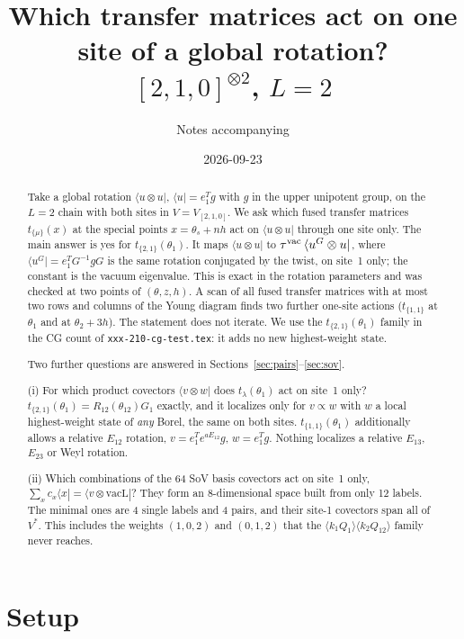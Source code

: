 \documentclass[11pt]{article}
\title{Which transfer matrices act on one site of a global rotation?\\
$[2,1,0]^{\otimes2}$, $L=2$}
\author{Notes accompanying \nb{L2-localizing-transfer.wb}}
\date{2026-09-23}
\newcommand{\nb}[1]{\texttt{#1}}
\theoremstyle{definition}
\theoremstyle{remark}
\begin{document}
\maketitle

\begin{abstract}
Take a global rotation $\langle u\otimes u|$, $\langle u|=e_1^Tg$ with $g$ in the upper unipotent group, on the $L=2$ chain with both sites in $V=V_{[2,1,0]}$. We ask which fused transfer matrices $t_{\{\mu\}}(x)$ at the special points $x=\theta_s+nh$ act on $\langle u\otimes u|$ through one site only. The main answer is yes for $t_{\{2,1\}}(\theta_1)$. It maps $\langle u\otimes u|$ to $\tau^{\rm vac}\,\langle u^G\otimes u|$, where $\langle u^G|=e_1^TG^{-1}gG$ is the same rotation conjugated by the twist, on site~1 only; the constant is the vacuum eigenvalue. This is exact in the rotation parameters and was checked at two points of $(\theta,z,h)$. A scan of all fused transfer matrices with at most two rows and columns of the Young diagram finds two further one-site actions ($t_{\{1,1\}}$ at $\theta_1$ and at $\theta_2+3h$). The statement does not iterate. We use the $t_{\{2,1\}}(\theta_1)$ family in the CG count of \nb{xxx-210-cg-test.tex}: it adds no new highest-weight state.

Two further questions are answered in Sections~\ref{sec:pairs}--\ref{sec:sov}.

(i) For which product covectors $\langle v\otimes w|$ does $t_\lambda(\theta_1)$ act on site~1 only? $t_{\{2,1\}}(\theta_1)=R_{12}(\theta_{12})G_1$ exactly, and it localizes only for $v\propto w$ with $w$ a local highest-weight state of \emph{any} Borel, the same on both sites. $t_{\{1,1\}}(\theta_1)$ additionally allows a relative $E_{12}$ rotation, $v=e_1^Te^{aE_{12}}g$, $w=e_1^Tg$. Nothing localizes a relative $E_{13}$, $E_{23}$ or Weyl rotation.

(ii) Which combinations of the 64 SoV basis covectors act on site~1 only, $\sum_xc_x\langle x|=\langle v\otimes\mathrm{vacL}|$? They form an 8-dimensional space built from only 12 labels. The minimal ones are 4 single labels and 4 pairs, and their site-1 covectors span all of $V^*$. This includes the weights $(1,0,2)$ and $(0,1,2)$ that the $\langle k_1Q_1\rangle\langle k_2Q_{12}\rangle$ family never reaches.
\end{abstract}

\tableofcontents

\section{Setup}
\end{document}
